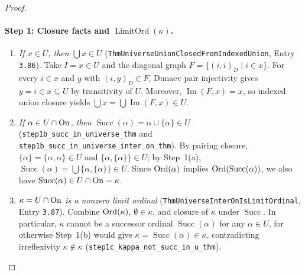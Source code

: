 \begin{proof}
\paragraph{Step 1: Closure facts and $\operatorname{LimitOrd}(\kappa)$.}
\begin{enumerate}
\item[(a)] \emph{If $x \in U$, then $\bigcup x \in U$} (\texttt{ThmUniverseUnionClosedFromIndexedUnion}, Entry \texttt{3.86}). Take $I = x \in U$ and the diagonal graph $F = \{(i, i)_D \mid i \in x\}$. For every $i \in x$ and $y$ with $(i, y)_D \in F$, Dunaev pair injectivity gives $y = i \in x \subseteq U$ by transitivity of $U$. Moreover, $\operatorname{Im}(F, x) = x$, so indexed union closure yields $\bigcup x = \bigcup\operatorname{Im}(F, x) \in U$.
\item[(b)] \emph{If $\alpha \in U \cap \mathrm{On}$, then $\operatorname{Succ}(\alpha) = \alpha \cup \{\alpha\} \in U$} (\texttt{step1b\_succ\_in\_universe\_thm} and \texttt{step1b\_succ\_in\_universe\_inter\_on\_thm}). By pairing closure, $\{\alpha\} = \{\alpha, \alpha\} \in U$ and $\{\alpha, \{\alpha\}\} \in U$; by Step~1(a), $\operatorname{Succ}(\alpha) = \bigcup\{\alpha, \{\alpha\}\} \in U$. Since $\mathrm{Ord}(\alpha)$ implies $\mathrm{Ord}(\operatorname{Succ}(\alpha))$, we also have $\operatorname{Succ}(\alpha) \in U \cap \mathrm{On} = \kappa$.
\item[(c)] \emph{$\kappa = U \cap \mathrm{On}$ is a nonzero limit ordinal} (\texttt{ThmUniverseInterOnIsLimitOrdinal}, Entry \texttt{3.87}). Combine $\mathrm{Ord}(\kappa)$, $\emptyset \in \kappa$, and closure of $\kappa$ under $\operatorname{Succ}$. In particular, $\kappa$ cannot be a successor ordinal $\operatorname{Succ}(\alpha)$ for any $\alpha \in U$, for otherwise Step~1(b) would give $\kappa = \operatorname{Succ}(\alpha) \in \kappa$, contradicting irreflexivity $\kappa \notin \kappa$ (\texttt{step1c\_kappa\_not\_succ\_in\_u\_thm}).
\end{enumerate}


\end{proof}
